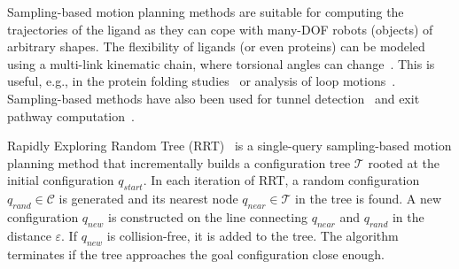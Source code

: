 \documentclass{svmult}
\def\qrand{q_{rand}}
\def\qstart{q_{start}}
\def\qinit{\qstart}
\def\qnear{q_{near}}
\def\qnew{q_{new}}
\def\T{\mathcal{T}}
\def\C{\mathcal{C}}
\begin{document}
Sampling-based motion planning methods are suitable for computing the trajectories of the ligand as they 
can cope with many-DOF robots (objects) of arbitrary shapes.
The flexibility of ligands (or even proteins) can be modeled using a multi-link kinematic chain, where torsional angles
can change~\cite{songPFpath}.
This is useful, e.g., in the protein folding studies~\cite{al2012motion,gipson2012computational,amato2002using,raveh2009rapid,novinskaya2015improving,songPFintro} or analysis of loop motions~\cite{cortes2004geometric}.
Sampling-based methods have also been used for 
 tunnel detection~\cite{vonasek2016application,vonasek2017tunnel} and
 exit pathway computation~\cite{cortes2010simulating,guieysse2008structure}.

Rapidly Exploring Random Tree (RRT)~\cite{lavalleRRT} is a single-query sampling-based motion planning method that 
incrementally builds a configuration tree $\T$ rooted at the initial configuration $\qinit$.
In each iteration of RRT, a random configuration $\qrand \in \C$ is generated and its nearest node $\qnear \in \T$ in the tree is found.
A new configuration $\qnew$ is constructed on the line connecting $\qnear$ and $\qrand$ in the distance $\varepsilon$.
If $\qnew$ is collision-free, it is added to the tree.
The algorithm terminates if the tree approaches the goal configuration close enough.

\end{document}

